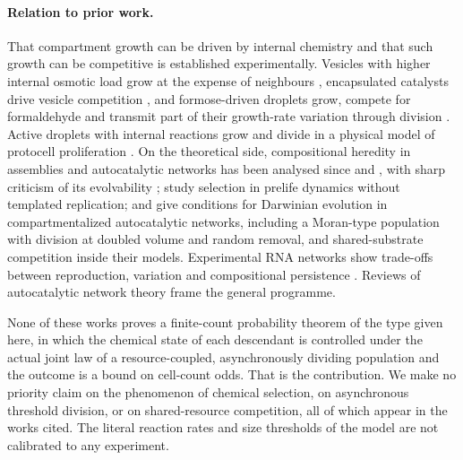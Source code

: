 \documentclass[11pt,a4paper]{article}
\theoremstyle{plain}
\theoremstyle{definition}
\theoremstyle{remark}
\begin{document}
\paragraph{Relation to prior work.}
That compartment growth can be driven by internal chemistry and that such growth can be competitive is established experimentally. Vesicles with higher internal osmotic load grow at the expense of neighbours \citep{chen2004}, encapsulated catalysts drive vesicle competition \citep{adamala2013}, and formose-driven droplets grow, compete for formaldehyde and transmit part of their growth-rate variation through division \citep{lu2024}. Active droplets with internal reactions grow and divide in a physical model of protocell proliferation \citep{zwicker2017}. On the theoretical side, compositional heredity in assemblies and autocatalytic networks has been analysed since \citet{segre2000} and \citet{szathmary1987}, with sharp criticism of its evolvability \citep{vasas2010,vasas2012}; \citet{nowak2008} study selection in prelife dynamics without templated replication; and \citet{matsubara2026} give conditions for Darwinian evolution in compartmentalized autocatalytic networks, including a Moran-type population with division at doubled volume and random removal, and shared-substrate competition inside their models. Experimental RNA networks show trade-offs between reproduction, variation and compositional persistence \citep{ameta2021}. Reviews of autocatalytic network theory \citep{kauffman1986,hordijk2004,blokhuis2020,nghe2015,serra2017} frame the general programme.

None of these works proves a finite-count probability theorem of the type given here, in which the chemical state of each descendant is controlled under the actual joint law of a resource-coupled, asynchronously dividing population and the outcome is a bound on cell-count odds. That is the contribution. We make no priority claim on the phenomenon of chemical selection, on asynchronous threshold division, or on shared-resource competition, all of which appear in the works cited. The literal reaction rates and size thresholds of the model are not calibrated to any experiment.
\end{document}
